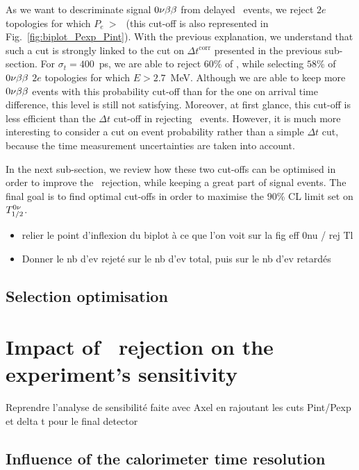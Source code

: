 As we want to descriminate signal $0\nu\beta\beta$ from delayed \Tl\ events, we reject $2e$ topologies for which $P_{e}~>~$\Pint\ (this cut-off is also represented in Fig.~\ref{fig:biplot_Pexp_Pint}).
With the previous explanation, we understand that such a cut is strongly linked to the cut on $\Delta t^{\text{corr}}$ presented in the previous sub-section.
For $\sigma_{t}=400$~ps, we are able to reject $60$\% of \Tl, while selecting $58$\% of $0\nu\beta\beta$ $2e$ topologies for which $E>2.7$~MeV.
Although we are able to keep more $0\nu\beta\beta$ events with this probability cut-off than for the one on arrival time difference, this level is still not satisfying.
Moreover, at first glance, this cut-off is less efficient than the $\Delta t$ cut-off in rejecting \Tl\ events.
However, it is much more interesting to consider a cut on event probability rather than a simple $\Delta t$ cut, because the time measurement uncertainties are taken into account.

In the next sub-section, we review how these two cut-offs can be optimised in order to improve the \Tl\ rejection, while keeping a great part of signal events.
The final goal is to find optimal cut-offs in order to maximise the $90$\% CL limit set on $T_{1/2}^{0\nu}$.

\begin{itemize}
\item relier le point d'inflexion du biplot à ce que l'on voit sur la fig eff 0nu / rej Tl
\item Donner le nb d'ev rejeté sur le nb d'ev total, puis sur le nb d'ev retardés
\end{itemize}

\subsection{Selection optimisation}
\label{subsec:selection_optimisation}


\section{Impact of \Tl\ rejection on the experiment's sensitivity}
Reprendre l'analyse de sensibilité faite avec Axel en rajoutant les cuts Pint/Pexp et delta t pour le final detector

\subsection{Influence of the calorimeter time resolution}

